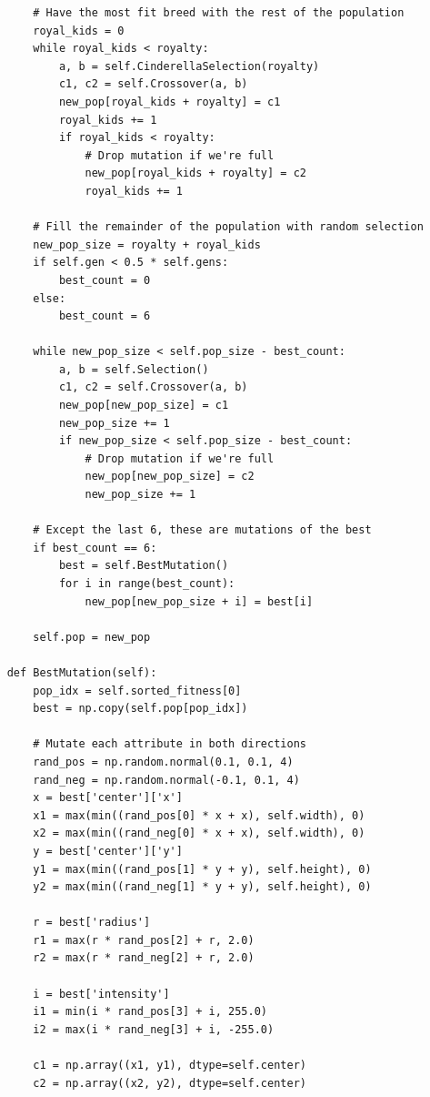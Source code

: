 \documentclass[12pt]{article}
\begin{document}
\begin{verbatim}
        # Have the most fit breed with the rest of the population
        royal_kids = 0
        while royal_kids < royalty:
            a, b = self.CinderellaSelection(royalty)
            c1, c2 = self.Crossover(a, b)
            new_pop[royal_kids + royalty] = c1
            royal_kids += 1
            if royal_kids < royalty:
                # Drop mutation if we're full
                new_pop[royal_kids + royalty] = c2
                royal_kids += 1

        # Fill the remainder of the population with random selection
        new_pop_size = royalty + royal_kids
        if self.gen < 0.5 * self.gens:
            best_count = 0
        else:
            best_count = 6

        while new_pop_size < self.pop_size - best_count:
            a, b = self.Selection()
            c1, c2 = self.Crossover(a, b)
            new_pop[new_pop_size] = c1
            new_pop_size += 1
            if new_pop_size < self.pop_size - best_count:
                # Drop mutation if we're full
                new_pop[new_pop_size] = c2
                new_pop_size += 1

        # Except the last 6, these are mutations of the best
        if best_count == 6:
            best = self.BestMutation()
            for i in range(best_count):
                new_pop[new_pop_size + i] = best[i]
        
        self.pop = new_pop

    def BestMutation(self):
        pop_idx = self.sorted_fitness[0]
        best = np.copy(self.pop[pop_idx])

        # Mutate each attribute in both directions
        rand_pos = np.random.normal(0.1, 0.1, 4)
        rand_neg = np.random.normal(-0.1, 0.1, 4)
        x = best['center']['x']
        x1 = max(min((rand_pos[0] * x + x), self.width), 0)
        x2 = max(min((rand_neg[0] * x + x), self.width), 0)
        y = best['center']['y']
        y1 = max(min((rand_pos[1] * y + y), self.height), 0)
        y2 = max(min((rand_neg[1] * y + y), self.height), 0)

        r = best['radius']
        r1 = max(r * rand_pos[2] + r, 2.0)
        r2 = max(r * rand_neg[2] + r, 2.0)

        i = best['intensity']
        i1 = min(i * rand_pos[3] + i, 255.0)
        i2 = max(i * rand_neg[3] + i, -255.0)

        c1 = np.array((x1, y1), dtype=self.center)
        c2 = np.array((x2, y2), dtype=self.center)


\end{verbatim}
\end{document}
